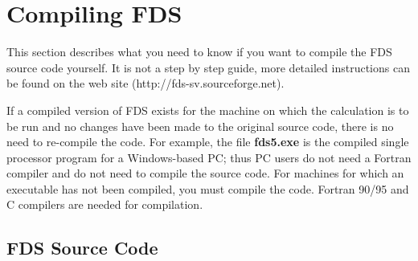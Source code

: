 \documentclass[11pt]{book}
\begin{document}
\chapter{Compiling FDS}
\label{info:compilation}

This section describes what you need to know if you want to compile the FDS source code yourself.
It is not a step by step guide, more detailed instructions can be found on the web site (http://fds-sv.sourceforge.net).

If a compiled version of FDS exists for the machine on which the
calculation is to be run and no changes have been made to
the original source code, there is no need to re-compile the code.
For example, the file {\bf fds5.exe} is the
compiled single processor program for a Windows-based PC;
thus PC users do not need a
Fortran compiler and do not need to compile the source code.
For machines for which an executable has not been compiled, you must
compile the code. Fortran 90/95 and C compilers are needed for compilation.

\section{FDS Source Code}
\end{document}
